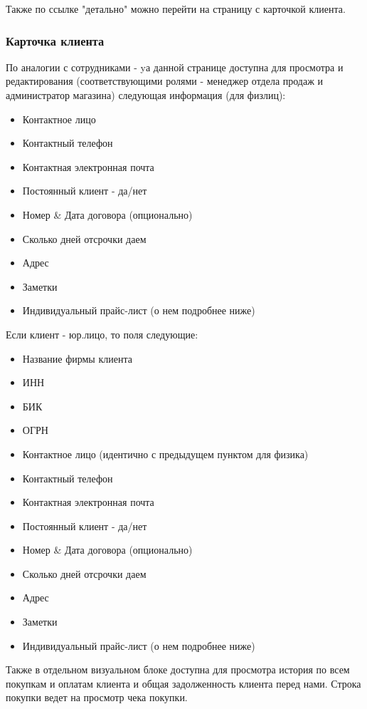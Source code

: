 \documentclass[DIV=calc, paper=a4, fontsize=11pt]{scrartcl} %
\begin{document}
Также по ссылке "детально" можно перейти на страницу с карточкой клиента.

\subsubsection{Карточка клиента}

По аналогии с сотрудниками - yа данной странице доступна для просмотра и редактирования (соответствующими ролями - менеджер отдела продаж и администратор магазина) следующая информация (для физлиц): 

\begin{itemize}
	\item Контактное лицо
	\item Контактный телефон
	\item Контактная электронная почта
	\item Постоянный клиент - да/нет
	\item Номер & Дата договора (опционально)
	\item Сколько дней отсрочки даем
	\item Адрес 
	\item Заметки
	\item Индивидуальный прайс-лист (о нем подробнее ниже)
\end{itemize}

Если клиент - юр.лицо, то поля следующие:

\begin{itemize}
	\item Название фирмы клиента
	\item ИНН
	\item БИК
	\item ОГРН
	\item Контактное лицо (идентично с предыдущем пунктом для физика)
	\item Контактный телефон
	\item Контактная электронная почта
	\item Постоянный клиент - да/нет
	\item Номер & Дата договора (опционально)
	\item Сколько дней отсрочки даем
	\item Адрес 
	\item Заметки
	\item Индивидуальный прайс-лист (о нем подробнее ниже)
\end{itemize}


Также в отдельном визуальном блоке доступна для просмотра история по всем покупкам и оплатам клиента и общая задолженность клиента перед нами. Строка покупки ведет на просмотр чека покупки.  
\end{document}
